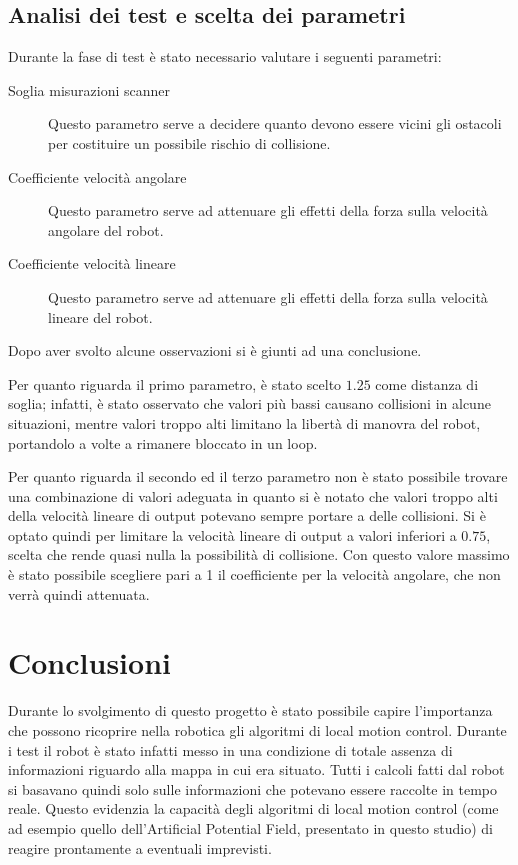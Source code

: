 \documentclass[Lau, binding=0.6cm, oneside]{sapthesis}
\begin{document}
\section{Analisi dei test e scelta dei parametri}
Durante la fase di test è stato necessario valutare i seguenti parametri:
\begin{description}
    \item[Soglia misurazioni scanner] Questo parametro serve a decidere quanto devono essere vicini gli ostacoli per costituire un possibile rischio di collisione.
    \item[Coefficiente velocità angolare] Questo parametro serve ad attenuare gli effetti della forza sulla velocità angolare del robot.
    \item[Coefficiente velocità lineare] Questo parametro serve ad attenuare gli effetti della forza sulla velocità lineare del robot.
\end{description}
Dopo aver svolto alcune osservazioni si è giunti ad una conclusione.

Per quanto riguarda il primo parametro, è stato scelto $1.25$ come distanza di soglia; infatti, è stato osservato che valori più bassi causano collisioni in alcune situazioni, mentre valori troppo alti limitano la libertà di manovra del robot, portandolo a volte a rimanere bloccato in un loop.

Per quanto riguarda il secondo ed il terzo parametro non è stato possibile trovare una combinazione di valori adeguata in quanto si è notato che valori troppo alti della velocità lineare di output potevano sempre portare a delle collisioni.
Si è optato quindi per limitare la velocità lineare di output a valori inferiori a $0.75$, scelta che rende quasi nulla la possibilità di collisione.
Con questo valore massimo è stato possibile scegliere pari a 1 il coefficiente per la velocità angolare, che non verrà quindi attenuata.

\chapter{Conclusioni}
Durante lo svolgimento di questo progetto è stato possibile capire l'importanza che possono ricoprire nella robotica gli algoritmi di local motion control.
Durante i test il robot è stato infatti messo in una condizione di totale assenza di informazioni riguardo alla mappa in cui era situato.
Tutti i calcoli fatti dal robot si basavano quindi solo sulle informazioni che potevano essere raccolte in tempo reale.
Questo evidenzia la capacità degli algoritmi di local motion control (come ad esempio quello dell'Artificial Potential Field, presentato in questo studio) di reagire prontamente a eventuali imprevisti.
\end{document}
